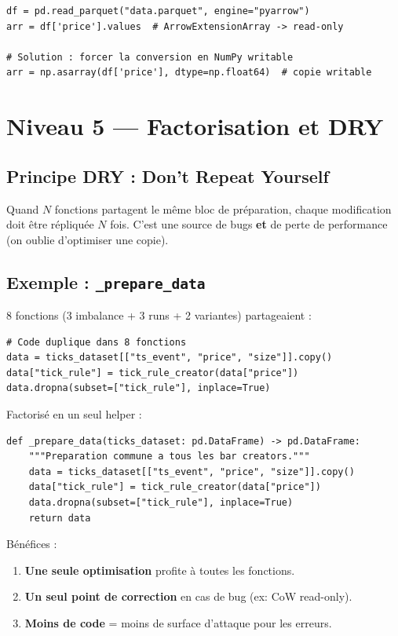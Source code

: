 \documentclass[11pt, a4paper]{article}
\begin{document}
\begin{lstlisting}
df = pd.read_parquet("data.parquet", engine="pyarrow")
arr = df['price'].values  # ArrowExtensionArray -> read-only

# Solution : forcer la conversion en NumPy writable
arr = np.asarray(df['price'], dtype=np.float64)  # copie writable
\end{lstlisting}


\section{Niveau 5 --- Factorisation et DRY}

\subsection{Principe DRY : Don't Repeat Yourself}

Quand $N$ fonctions partagent le m\^eme bloc de pr\'eparation, chaque
modification doit \^etre r\'epliqu\'ee $N$ fois. C'est une source de bugs
\textbf{et} de perte de performance (on oublie d'optimiser une copie).

\subsection{Exemple : \texttt{\_prepare\_data}}

8 fonctions (3 imbalance + 3 runs + 2 variantes) partageaient :

\begin{lstlisting}
# Code duplique dans 8 fonctions
data = ticks_dataset[["ts_event", "price", "size"]].copy()
data["tick_rule"] = tick_rule_creator(data["price"])
data.dropna(subset=["tick_rule"], inplace=True)
\end{lstlisting}

Factoris\'e en un seul helper :

\begin{lstlisting}
def _prepare_data(ticks_dataset: pd.DataFrame) -> pd.DataFrame:
    """Preparation commune a tous les bar creators."""
    data = ticks_dataset[["ts_event", "price", "size"]].copy()
    data["tick_rule"] = tick_rule_creator(data["price"])
    data.dropna(subset=["tick_rule"], inplace=True)
    return data
\end{lstlisting}

B\'en\'efices :
\begin{enumerate}
    \item \textbf{Une seule optimisation} profite \`a toutes les fonctions.
    \item \textbf{Un seul point de correction} en cas de bug (ex: CoW read-only).
    \item \textbf{Moins de code} = moins de surface d'attaque pour les erreurs.
\end{enumerate}
\end{document}
